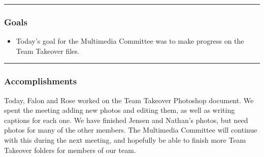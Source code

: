 \noindent\hfil\rule{\textwidth}{.4pt}\hfil
\subsubsection*{Goals}
\begin{itemize}
    \item Today's goal for the Multimedia Committee was to make progress on the Team Takeover files.
  

\end{itemize} 

\noindent\hfil\rule{\textwidth}{.4pt}\hfil

\subsubsection*{Accomplishments}
Today, Falon and Rose worked on the Team Takeover Photoshop document. We spent the meeting adding new photos and editing them, as well as writing captions for each one. We have finished Jensen and Nathan's photos, but need photos for many of the other members. The Multimedia Committee will continue with this during the next meeting, and hopefully be able to finish more Team Takeover folders for members of our team.